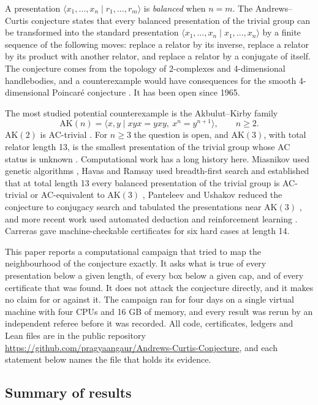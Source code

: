 \documentclass[11pt,a4paper]{article}
\theoremstyle{definition}
\newcommand{\AK}{\mathrm{AK}}
\newcommand{\repo}{\url{https://github.com/pragyaangaur/Andrews-Curtis-Conjecture}}
\begin{document}
A presentation $\langle x_1,\dots,x_n \mid r_1,\dots,r_m\rangle$ is \emph{balanced} when $n=m$. The Andrews--Curtis conjecture \cite{AC65} states that every balanced presentation of the trivial group can be transformed into the standard presentation $\langle x_1,\dots,x_n\mid x_1,\dots,x_n\rangle$ by a finite sequence of the following moves: replace a relator by its inverse, replace a relator by its product with another relator, and replace a relator by a conjugate of itself. The conjecture comes from the topology of 2-complexes and 4-dimensional handlebodies, and a counterexample would have consequences for the smooth 4-dimensional Poincar\'e conjecture \cite{AK85,HMS93}. It has been open since 1965.

The most studied potential counterexample is the Akbulut--Kirby family
\[
\AK(n)=\langle x,y \mid xyx = yxy,\ x^n = y^{n+1}\rangle,\qquad n\ge 2.
\]
$\AK(2)$ is AC-trivial \cite{Mia99}. For $n\ge3$ the question is open, and $\AK(3)$, with total relator length 13, is the smallest presentation of the trivial group whose AC status is unknown \cite{HR03}. Computational work has a long history here. Miasnikov used genetic algorithms \cite{Mia99}, Havas and Ramsay used breadth-first search and established that at total length 13 every balanced presentation of the trivial group is AC-trivial or AC-equivalent to $\AK(3)$ \cite{HR03}, Panteleev and Ushakov reduced the conjecture to conjugacy search and tabulated the presentations near $\AK(3)$ \cite{PU19}, and more recent work used automated deduction \cite{Lis25} and reinforcement learning \cite{SMF25,FTS26}. Carreras \cite{Car26} gave machine-checkable certificates for six hard cases at length 14.

This paper reports a computational campaign that tried to map the neighbourhood of the conjecture exactly. It asks what is true of every presentation below a given length, of every box below a given cap, and of every certificate that was found. It does not attack the conjecture directly, and it makes no claim for or against it. The campaign ran for four days on a single virtual machine with four CPUs and 16 GB of memory, and every result was rerun by an independent referee before it was recorded. All code, certificates, ledgers and Lean files are in the public repository \repo, and each statement below names the file that holds its evidence.

\subsection{Summary of results}
\end{document}
